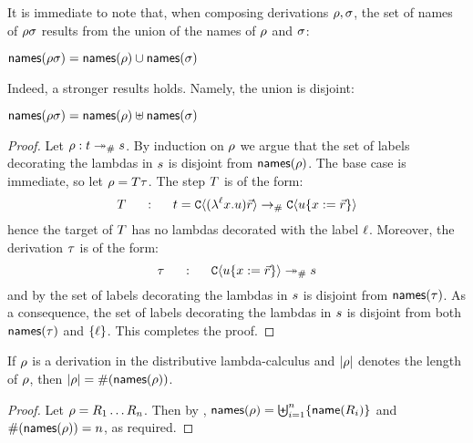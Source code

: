It is immediate to note that,
when composing derivations $\rho, \sigma$,
the set of names of $\rho\sigma$
results from the union of the names of $\rho$ and $\sigma$:

\begin{remark}
$\mathsf{names}(\rho\sigma) = \mathsf{names}(\rho) \cup \mathsf{names}(\sigma)$
\end{remark}

Indeed, a stronger results holds. Namely, the union is disjoint:

\begin{lemma}
$\mathsf{names}(\rho\sigma) = \mathsf{names}(\rho) \uplus \mathsf{names}(\sigma)$
\end{lemma}
\begin{proof}
Let $\rho : t \mathrel{\twoheadrightarrow_{\mathtt{\#}}} s$.
By induction on $\rho$ we argue that the set of labels decorating the lambdas in $s$
is disjoint from $\mathsf{names}(\rho)$.
The base case is immediate, so let $\rho = T\tau$.
The step $T$ is of the form:
\[
  T \hspace{.5cm}:\hspace{.5cm}
  t =
  \mathtt{C}\langle(\lambda^{\ell} x. u)\vec{r}\rangle
  \mathrel{\to_{\mathtt{\#}}}
  \mathtt{C}\langle u\{x := \vec{r}\}\rangle
\]
hence the target of $T$ has no lambdas decorated with the label $\ell$.
Moreover, the derivation $\tau$ is of the form:
\[
  \tau \hspace{.5cm}:\hspace{.5cm}
  \mathtt{C}\langle u\{x := \vec{r}\}\rangle
  \mathrel{\twoheadrightarrow_{\mathtt{\#}}}
  s
\]
and by \ih the set of labels decorating the lambdas in $s$
is disjoint from $\mathsf{names}(\tau)$.
As a consequence,
the set of labels decorating the lambdas in $s$
is disjoint from both $\mathsf{names}(\tau)$
and $\{\ell\}$.
This completes the proof.
\end{proof}

\begin{corollary}
If $\rho$ is a derivation in the distributive lambda-calculus
and $|\rho|$ denotes the length of $\rho$,
then
$|\rho| = \#(\mathsf{names}(\rho))$.
\end{corollary}
\begin{proof}
Let $\rho = R_1\hdots R_n$.
Then by ,
$\mathsf{names}(\rho) = \biguplus_{i=1}^{n} \{\mathsf{name}(R_i)\}$
and
$\#(\mathsf{names}(\rho)) = n$, as required.
\end{proof}

